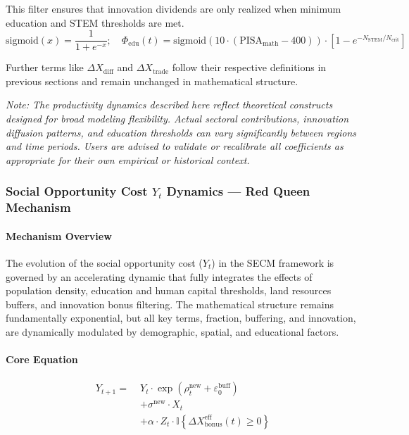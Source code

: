 \documentclass[12pt]{report}
\begin{document}
This filter ensures that innovation dividends are only realized when minimum education and STEM thresholds are met.
\begin{equation*}
\text{sigmoid}(x) = \frac{1}{1 + e^{-x}};
\quad
\Phi_{\text{edu}}(t) = \text{sigmoid}(10 \cdot (\text{PISA}_{\text{math}} - 400)) \cdot \left[1 - e^{-N_{\text{STEM}} / N_{\text{crit}}} \right]
\end{equation*}

Further terms like $\Delta X_{\text{diff}}$ and $\Delta X_{\text{trade}}$ follow their respective definitions in previous sections and remain unchanged in mathematical structure.

\textit{Note: The productivity dynamics described here reflect theoretical constructs designed for broad modeling flexibility. Actual sectoral contributions, innovation diffusion patterns, and education thresholds can vary significantly between regions and time periods. Users are advised to validate or recalibrate all coefficients as appropriate for their own empirical or historical context.}\\

\subsubsection{Social Opportunity Cost $Y_t$ Dynamics — Red Queen Mechanism}

\paragraph{Mechanism Overview}
The evolution of the social opportunity cost ($Y_t$) in the SECM framework is governed by an accelerating dynamic that fully integrates the effects of population density, education and human capital thresholds, land resources buffers, and innovation bonus filtering. The mathematical structure remains fundamentally exponential, but all key terms, fraction, buffering, and innovation, are dynamically modulated by demographic, spatial, and educational factors.

\paragraph{Core Equation}
\begin{align*}
Y_{t+1} =\; & Y_t \cdot \exp\left( \rho_t^{\text{new}} + \varepsilon_0^{\text{buff}} \right) \\
& + \sigma^{\text{new}} \cdot X_t \\
& + \alpha \cdot Z_t \cdot \mathbb{I} \left\{ \Delta X_{\text{bonus}}^{\text{eff}}(t) \geq 0 \right\}
\end{align*}
\end{document}

